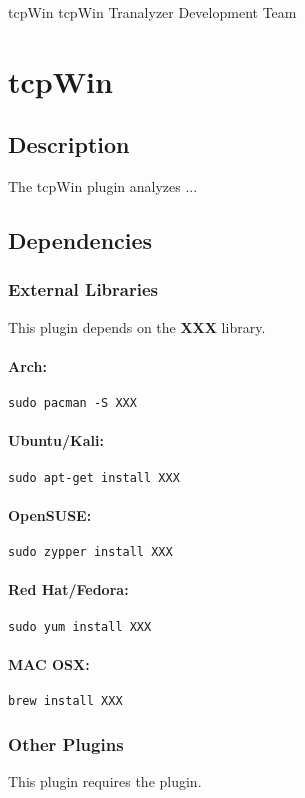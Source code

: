 \documentclass[documentation]{subfiles}
\begin{document}
\trantitle
    {tcpWin} %
    {tcpWin} %
    {Tranalyzer Development Team} %

\section{tcpWin}\label{s:tcpWin}

\subsection{Description}
The tcpWin plugin analyzes ...

\subsection{Dependencies}



\subsubsection{External Libraries}
This plugin depends on the {\bf XXX} library.
\paragraph{Arch:} {\tt sudo pacman -S XXX}
\paragraph{Ubuntu/Kali:} {\tt sudo apt-get install XXX}
\paragraph{OpenSUSE:} {\tt sudo zypper install XXX}
\paragraph{Red Hat/Fedora:} {\tt sudo yum install XXX}
\paragraph{MAC OSX:} {\tt brew install XXX}

\subsubsection{Other Plugins}
This plugin requires the  plugin.
\end{document}
